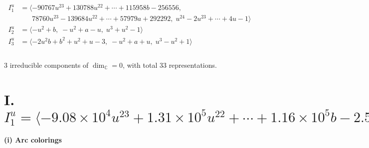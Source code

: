 \documentclass[1p]{elsarticle_modified}
\theoremstyle{definition}
\begin{document}
\begin{align*}
I^u_{1}&=\langle 
-90767 u^{23}+130788 u^{22}+\cdots+115958 b-256556,\\
\phantom{I^u_{1}}&\phantom{= \langle  }78760 u^{23}-139684 u^{22}+\cdots+57979 a+292292,\;u^{24}-2 u^{23}+\cdots+4 u-1\rangle \\
I^u_{2}&=\langle 
- u^2+b,\;- u^2+a- u,\;u^3+u^2-1\rangle \\
I^u_{3}&=\langle 
-2 u^2 b+b^2+u^2+u-3,\;- u^2+a+u,\;u^3- u^2+1\rangle \\
\\
\end{align*}
\raggedright * 3 irreducible components of $\dim_{\mathbb{C}}=0$, with total 33 representations.\\
\newpage
\renewcommand{\arraystretch}{1}
\centering \section*{I. $I^u_{1}= \langle -9.08\times10^{4} u^{23}+1.31\times10^{5} u^{22}+\cdots+1.16\times10^{5} b-2.57\times10^{5},\;78760 u^{23}-139684 u^{22}+\cdots+57979 a+292292,\;u^{24}-2 u^{23}+\cdots+4 u-1 \rangle$}
\flushleft \textbf{(i) Arc colorings}\\
\end{document}
